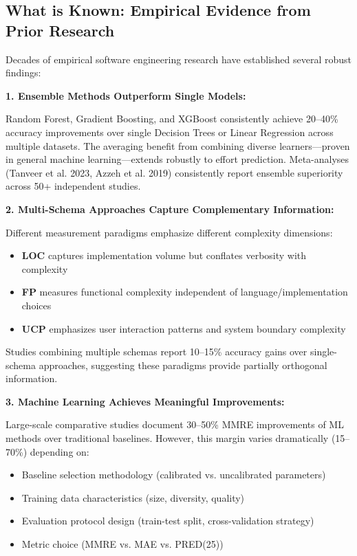 \documentclass[11pt,a4paper]{article}
\begin{document}
\subsection{What is Known: Empirical Evidence from Prior Research}

Decades of empirical software engineering research have established several robust findings:

\textbf{1. Ensemble Methods Outperform Single Models:}

Random Forest, Gradient Boosting, and XGBoost consistently achieve 20--40\% accuracy improvements over single Decision Trees or Linear Regression across multiple datasets. The averaging benefit from combining diverse learners---proven in general machine learning---extends robustly to effort prediction. Meta-analyses (Tanveer et al. 2023, Azzeh et al. 2019) consistently report ensemble superiority across 50+ independent studies.

\textbf{2. Multi-Schema Approaches Capture Complementary Information:}

Different measurement paradigms emphasize different complexity dimensions:
\begin{itemize}
    \item \textbf{LOC} captures implementation volume but conflates verbosity with complexity
    \item \textbf{FP} measures functional complexity independent of language/implementation choices
    \item \textbf{UCP} emphasizes user interaction patterns and system boundary complexity
\end{itemize}

Studies combining multiple schemas report 10--15\% accuracy gains over single-schema approaches, suggesting these paradigms provide partially orthogonal information.

\textbf{3. Machine Learning Achieves Meaningful Improvements:}

Large-scale comparative studies document 30--50\% MMRE improvements of ML methods over traditional baselines. However, this margin varies dramatically (15--70\%) depending on:
\begin{itemize}
    \item Baseline selection methodology (calibrated vs. uncalibrated parameters)
    \item Training data characteristics (size, diversity, quality)
    \item Evaluation protocol design (train-test split, cross-validation strategy)
    \item Metric choice (MMRE vs. MAE vs. PRED(25))
\end{itemize}
\end{document}
